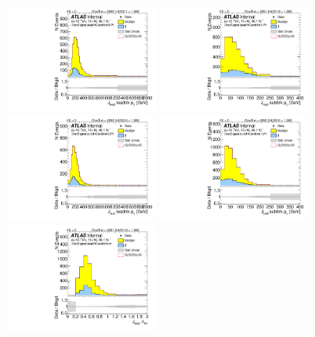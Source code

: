 \begin{figure}[htbp!]
\begin{center}
\includegraphics[width=0.45\textwidth,angle=-90]{figures/boosted/Signal/b77_TwoTag_split_Signal_leadHCand_trk0_Pt_blind.pdf}
\includegraphics[width=0.45\textwidth,angle=-90]{figures/boosted/Signal/b77_TwoTag_split_Signal_leadHCand_trk1_Pt_blind.pdf}\\
\includegraphics[width=0.45\textwidth,angle=-90]{figures/boosted/Signal/b77_TwoTag_split_Signal_sublHCand_trk0_Pt_blind.pdf}
\includegraphics[width=0.45\textwidth,angle=-90]{figures/boosted/Signal/b77_TwoTag_split_Signal_sublHCand_trk1_Pt_blind.pdf}\\
\includegraphics[width=0.45\textwidth,angle=-90]{figures/boosted/Signal/b77_TwoTag_split_Signal_leadHCand_trk_dr_blind.pdf}

\end{center}
\end{figure}
